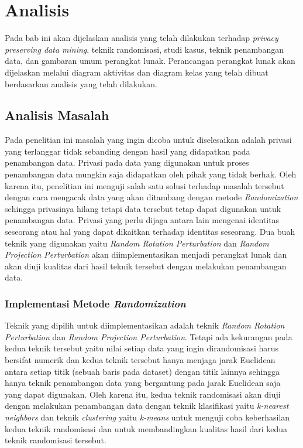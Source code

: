 \chapter{Analisis}
\label{chap:analisis}

Pada bab ini akan dijelaskan analisis yang telah dilakukan terhadap \textit{privacy preserving data mining}, teknik randomisasi, studi kasus, teknik penambangan data, dan gambaran umum perangkat lunak. Perancangan perangkat lunak akan dijelaskan melalui diagram aktivitas dan diagram kelas yang telah dibuat berdasarkan analisis yang telah dilakukan.

\section{Analisis Masalah}
\label{sec:analisis-masalah}

Pada penelitian ini masalah yang ingin dicoba untuk diselesaikan adalah privasi yang terlanggar tidak sebanding dengan hasil yang didapatkan pada penambangan data. Privasi pada data yang digunakan untuk proses penambangan data mungkin saja didapatkan oleh pihak yang tidak berhak. Oleh karena itu, penelitian ini menguji salah satu solusi terhadap masalah tersebut dengan cara mengacak data yang akan ditambang dengan metode \textit{Randomization} sehingga privasinya hilang tetapi data tersebut tetap dapat digunakan untuk penambangan data. Privasi yang perlu dijaga antara lain mengenai identitas seseorang atau hal yang dapat dikaitkan terhadap identitas seseorang. Dua buah teknik yang digunakan yaitu \textit{Random Rotation Perturbation} dan \textit{Random Projection Perturbation} akan diimplementasikan menjadi perangkat lunak dan akan diuji kualitas dari hasil teknik tersebut dengan melakukan penambangan data.

\subsection{Implementasi Metode \textit{Randomization}}
\label{subsec:analisis-ppdm}

Teknik yang dipilih untuk diimplementasikan adalah teknik \textit{Random Rotation Perturbation} dan \textit{Random Projection Perturbation}. Tetapi ada kekurangan pada kedua teknik tersebut yaitu nilai setiap data yang ingin dirandomisasi harus bersifat numerik dan kedua teknik tersebut hanya menjaga jarak Euclidean antara setiap titik (sebuah baris pada dataset) dengan titik lainnya sehingga hanya teknik penambangan data yang bergantung pada jarak Euclidean saja yang dapat digunakan. Oleh karena itu, kedua teknik randomisasi akan diuji dengan melakukan penambangan data dengan teknik klasifikasi yaitu \textit{k-nearest neighbors} dan teknik \textit{clustering} yaitu \textit{k-means} untuk menguji coba keberhasilan kedua teknik randomisasi dan untuk membandingkan kualitas hasil dari kedua teknik randomisasi tersebut.


